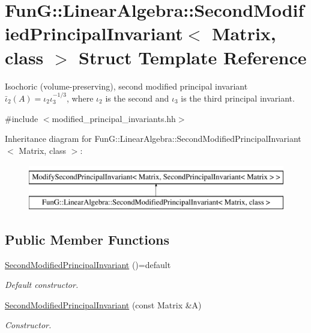 \hypertarget{structFunG_1_1LinearAlgebra_1_1SecondModifiedPrincipalInvariant}{\section{Fun\-G\-:\-:Linear\-Algebra\-:\-:Second\-Modified\-Principal\-Invariant$<$ Matrix, class $>$ Struct Template Reference}
\label{structFunG_1_1LinearAlgebra_1_1SecondModifiedPrincipalInvariant}
}


Isochoric (volume-\/preserving), second modified principal invariant $ \bar\iota_2(A)=\iota_2\iota_3^{-1/3} $, where $\iota_2$ is the second and $\iota_3$ is the third principal invariant.  




{\ttfamily \#include $<$modified\-\_\-principal\-\_\-invariants.\-hh$>$}

Inheritance diagram for Fun\-G\-:\-:Linear\-Algebra\-:\-:Second\-Modified\-Principal\-Invariant$<$ Matrix, class $>$\-:\begin{figure}[H]
\begin{center}
\leavevmode
\includegraphics[height=2.000000cm]{structFunG_1_1LinearAlgebra_1_1SecondModifiedPrincipalInvariant}
\end{center}
\end{figure}
\subsection*{Public Member Functions}
\begin{DoxyCompactItemize}
\item 
\hypertarget{structFunG_1_1LinearAlgebra_1_1SecondModifiedPrincipalInvariant_a95ec294b3f02c3c68db75b96cf4ac2ef}{\hyperlink{structFunG_1_1LinearAlgebra_1_1SecondModifiedPrincipalInvariant_a95ec294b3f02c3c68db75b96cf4ac2ef}{Second\-Modified\-Principal\-Invariant} ()=default}\label{structFunG_1_1LinearAlgebra_1_1SecondModifiedPrincipalInvariant_a95ec294b3f02c3c68db75b96cf4ac2ef}

\begin{DoxyCompactList}\small\item\em Default constructor. \end{DoxyCompactList}\item 
\hyperlink{structFunG_1_1LinearAlgebra_1_1SecondModifiedPrincipalInvariant_a9db5c7a268d5d18833dcaca51aebcba2}{Second\-Modified\-Principal\-Invariant} (const Matrix \&A)
\begin{DoxyCompactList}\small\item\em Constructor. \end{DoxyCompactList}\end{DoxyCompactItemize}


